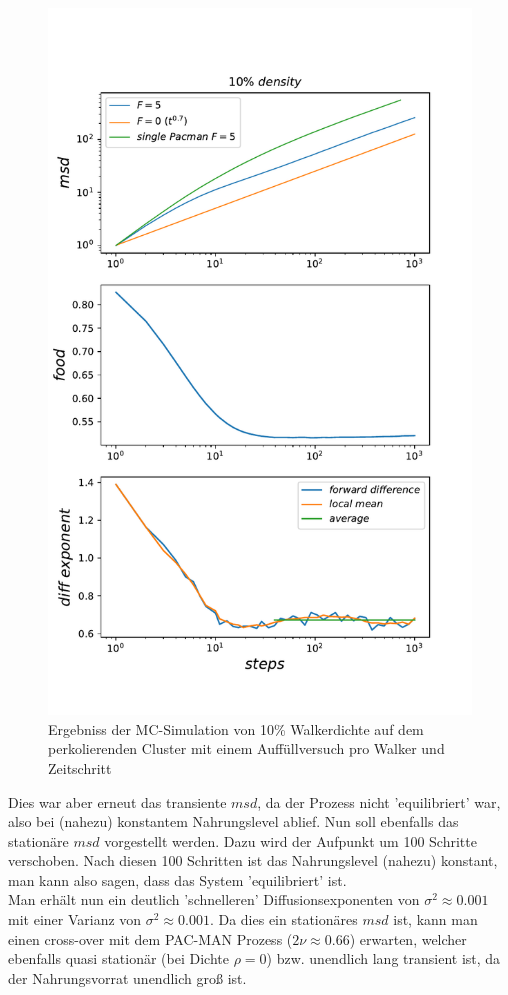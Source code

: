 \documentclass[a4paper, 12pt]{report}
\begin{document}
\begin{figure}[H]
	\centering
	\includegraphics[scale=0.75]{10percent_new_food1.pdf}
	\caption{Ergebniss der MC-Simulation von 10\% Walkerdichte auf dem perkolierenden Cluster mit einem Auffüllversuch pro Walker und Zeitschritt}
\end{figure}

\clearpage

\noindent Dies war aber erneut das transiente $msd$, da der Prozess nicht 'equilibriert' war, also bei (nahezu) konstantem Nahrungslevel ablief. Nun soll ebenfalls das stationäre $msd$ vorgestellt werden. Dazu wird der Aufpunkt um 100 Schritte verschoben. Nach diesen 100 Schritten ist das Nahrungslevel (nahezu) konstant, man kann also sagen, dass das System 'equilibriert' ist.
\\
Man erhält nun ein deutlich 'schnelleren' Diffusionsexponenten von  $\sigma^2 \approx 0.001$ mit einer Varianz von  $\sigma^2 \approx 0.001$. Da dies ein stationäres $msd$ ist, kann man einen cross-over mit dem PAC-MAN Prozess ($2\nu \approx 0.66$) erwarten, welcher ebenfalls quasi stationär (bei Dichte $\rho=0$) bzw. unendlich lang transient ist, da der Nahrungsvorrat unendlich groß ist.
\end{document}
